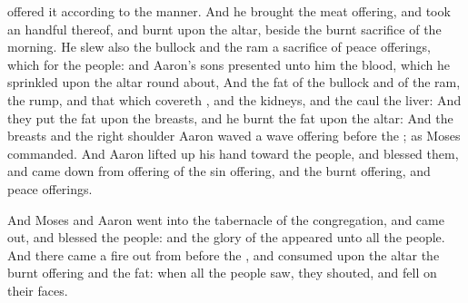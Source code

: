 {offered it according to the
manner.
And he
brought the meat
offering, and
took an
handful thereof, and
burnt
{} upon the
altar,
beside the burnt
sacrifice of the
morning.
He
slew also the
bullock and the
ram
{} a
sacrifice of peace
offerings, which
{} for the
people: and
Aaron’s
sons
presented unto him the
blood, which he
sprinkled upon the
altar round
about,
And the
fat of the
bullock and of the
ram, the
rump, and that which
covereth
{}, and the
kidneys, and the
caul
{} the
liver:
And they
put the
fat upon the
breasts, and he
burnt the
fat upon the
altar:
And the
breasts and the
right
shoulder
Aaron
waved
{} a wave
offering
before the
{}; as
Moses
commanded.
And
Aaron lifted
up his
hand toward the
people, and
blessed them, and came
down from
offering of the sin
offering, and the burnt
offering, and peace
offerings.
\par }{\PP {}And
Moses and
Aaron
went into the
tabernacle of the
congregation, and came
out, and
blessed the
people: and the
glory of the
{}
appeared unto all the
people.
And there
came a
fire out from
before the
{}, and
consumed upon the
altar the burnt
offering and the
fat:
{} when all the
people
saw, they
shouted, and
fell on their
faces.

}
